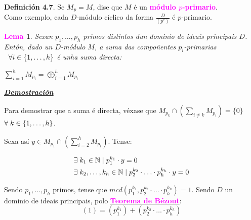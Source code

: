 \documentclass[twoside]{report}
\newcommand{\magbf}[1]{\textcolor{magenta}{\textbf{#1}}} %
\theoremstyle{mystyle}
\newtheorem{lem}{\magbf{Lema}}[chapter]
\newenvironment{lemma}
{\begin{mdframed}[linecolor = magenta,backgroundcolor = classicrose, linewidth = 2mm]\begin{lem}}
{\end{lem}\end{mdframed}}
\begin{document}
\noindent \textbf{Definición 4.7}. Se $M_{p} = M$, dise que $M$ é un \magbf{módulo $p$-primario}.\\

\noindent Como exemplo, cada $D$-módulo cíclico da forma $\displaystyle \frac{D}{(p^{e})}$ é $p$-primario.\\

\vspace{3mm}

\begin{lemma} \label{lem4.3}
Sexan $p_{1}, \dots, p_{h}$ primos distintos dun dominio de ideais principais $D$. Entón, dado un $D$-módulo $M$, a suma das compoñentes $p_{i}$-primarias $\hspace{2mm} \forall i \in \{1, \dots, h\}$ é unha suma directa:
\begin{center}
    $\displaystyle \sum_{i = 1}^{h}M_{p_{i}} = \bigoplus_{i = 1}^{h}M_{p_{i}}$ 
\end{center}
\end{lemma}

\vspace{2mm}

\noindent \textbf{\textit{\underline{Demostración}}}

\vspace{2mm}

\noindent Para demostrar que a suma é directa, véxase que $M_{p_{k}} \cap \left(\displaystyle \sum_{i \neq k}M_{p_{i}}\right) = \{0\}$ \hspace{2mm} $\forall \hspace{1mm} k \in \{1, \dots, h\}$.

\noindent Sexa así $y \in M_{p_{1}} \cap \left(\displaystyle \sum_{i = 2}^{h}M_{p_{i}}\right)$. Tense:

\begin{align*}
\exists & \hspace{1mm} k_{1} \in \mathbb{N} \hspace{1mm} | \hspace{1mm} p_{1}^{k_{1}} \cdot y = 0 \\
\exists & \hspace{1mm} k_{2}, \dots, k_{h} \in \mathbb{N} \hspace{1mm} | \hspace{1mm} p_{2}^{k_{2}} \cdot \ldots \cdot p_{h}^{k_{h}} \cdot y = 0
\end{align*}

\vspace{3mm}

\noindent Sendo $p_{1}, \dots, p_{h}$ primos, tense que $mcd(p_{1}^{k_{1}}, p_{2}^{k_{2}} \cdot \ldots \cdot p_{h}^{k_{h}}) = 1$. Sendo $D$ un dominio de ideais principais, polo \hyperref[lem2.2]{\magbf{Teorema de Bézout}}:
$$(1) = (p_{1}^{k_{1}}) + (p_{2}^{k_{2}} \cdot \ldots \cdot p_{h}^{k_{h}})$$
\end{document}
